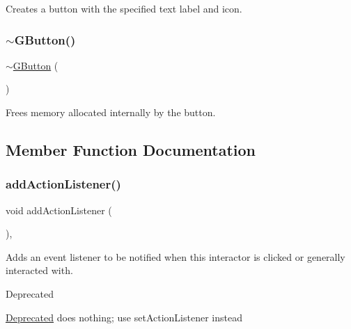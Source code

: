 Creates a button with the specified text label and icon. 

\mbox{\label{classsgl_1_1GButton_ae8f3d0d454867ef8bc9e7cd69e80f663}} 
\subsubsection{\texorpdfstring{$\sim$\+G\+Button()}{~GButton()}}
{\footnotesize\ttfamily $\sim$\mbox{\hyperlink{classsgl_1_1GButton}{G\+Button}} (\begin{DoxyParamCaption}{ }\end{DoxyParamCaption})\hspace{0.3cm}{\ttfamily [override]}}



Frees memory allocated internally by the button. 



\subsection{Member Function Documentation}
\mbox{\label{classsgl_1_1GInteractor_a02f20ea6edfa0671f31c4c648a253833}} 
\subsubsection{\texorpdfstring{add\+Action\+Listener()}{addActionListener()}}
{\footnotesize\ttfamily void add\+Action\+Listener (\begin{DoxyParamCaption}{ }\end{DoxyParamCaption})\hspace{0.3cm}{\ttfamily [virtual]}, {\ttfamily [inherited]}}



Adds an event listener to be notified when this interactor is clicked or generally interacted with. 

\begin{DoxyRefDesc}{Deprecated}
\item[\mbox{\hyperlink{deprecated__deprecated000006}{Deprecated}}]does nothing; use set\+Action\+Listener instead \end{DoxyRefDesc}
\mbox{\label{classsgl_1_1GObservable_a80cfa040459ff53594adbd6a51ec8f43}} 
